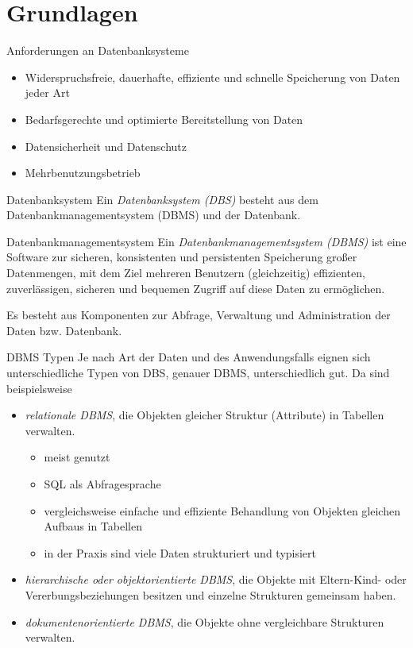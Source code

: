 \section{Grundlagen}

\begin{defi}{Anforderungen an Datenbanksysteme}
    \begin{itemize}
        \item Widerspruchsfreie, dauerhafte, effiziente und schnelle Speicherung von Daten jeder Art
        \item Bedarfsgerechte und optimierte Bereitstellung von Daten
        \item Datensicherheit und Datenschutz
        \item Mehrbenutzungsbetrieb
    \end{itemize}
\end{defi}

\begin{defi}{Datenbanksystem}
    Ein \emph{Datenbanksystem (DBS)} besteht aus dem Datenbankmanagementsystem (DBMS) und der Datenbank.
\end{defi}

\begin{defi}{Datenbankmanagementsystem}
    Ein \emph{Datenbankmanagementsystem (DBMS)} ist eine Software zur sicheren, konsistenten und persistenten Speicherung großer Datenmengen, mit dem Ziel mehreren Benutzern (gleichzeitig) effizienten, zuverlässigen, sicheren und bequemen Zugriff auf diese Daten zu ermöglichen.

    Es besteht aus Komponenten zur Abfrage, Verwaltung und Administration der Daten bzw. Datenbank.
\end{defi}

\begin{bonus}{DBMS Typen}
    Je nach Art der Daten und des Anwendungsfalls eignen sich unterschiedliche Typen von DBS, genauer DBMS, unterschiedlich gut.
    Da sind beispielsweise
    \begin{itemize}
        \item \emph{relationale DBMS}, die Objekten gleicher Struktur (Attribute) in Tabellen verwalten.
              \begin{itemize}
                  \item meist genutzt
                  \item SQL als Abfragesprache
                  \item vergleichsweise einfache und effiziente Behandlung von Objekten gleichen Aufbaus in Tabellen
                  \item in der Praxis sind viele Daten strukturiert und typisiert
              \end{itemize}
        \item \emph{hierarchische oder objektorientierte DBMS}, die Objekte mit Eltern-Kind- oder Vererbungsbeziehungen besitzen und einzelne Strukturen gemeinsam haben.
        \item \emph{dokumentenorientierte DBMS}, die Objekte ohne vergleichbare Strukturen verwalten.
    \end{itemize}
\end{bonus}

